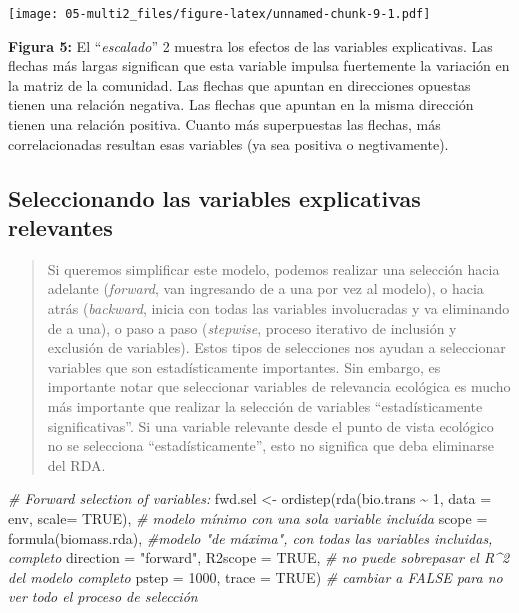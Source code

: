 \documentclass[
]{book}
\newenvironment{Shaded}{\begin{snugshade}}{\end{snugshade}}
\newcommand{\AttributeTok}[1]{\textcolor[rgb]{0.77,0.63,0.00}{#1}}
\newcommand{\CommentTok}[1]{\textcolor[rgb]{0.56,0.35,0.01}{\textit{#1}}}
\newcommand{\ConstantTok}[1]{\textcolor[rgb]{0.00,0.00,0.00}{#1}}
\newcommand{\DecValTok}[1]{\textcolor[rgb]{0.00,0.00,0.81}{#1}}
\newcommand{\FunctionTok}[1]{\textcolor[rgb]{0.00,0.00,0.00}{#1}}
\newcommand{\NormalTok}[1]{#1}
\newcommand{\OtherTok}[1]{\textcolor[rgb]{0.56,0.35,0.01}{#1}}
\newcommand{\SpecialCharTok}[1]{\textcolor[rgb]{0.00,0.00,0.00}{#1}}
\newcommand{\StringTok}[1]{\textcolor[rgb]{0.31,0.60,0.02}{#1}}
\begin{document}
\texttt{[image: 05-multi2\_files/figure-latex/unnamed-chunk-9-1.pdf]}

\textbf{Figura 5:} El ``\emph{escalado}'' 2 muestra los efectos de las variables explicativas. Las flechas más largas significan que esta variable impulsa fuertemente la variación en la matriz de la comunidad. Las flechas que apuntan en direcciones opuestas tienen una relación negativa. Las flechas que apuntan en la misma dirección tienen una relación positiva. Cuanto más superpuestas las flechas, más correlacionadas resultan esas variables (ya sea positiva o negtivamente).

\hypertarget{seleccionando-las-variables-explicativas-relevantes}{%
\subsection{Seleccionando las variables explicativas relevantes}\label{seleccionando-las-variables-explicativas-relevantes}}

\begin{quote}
Si queremos simplificar este modelo, podemos realizar una selección hacia adelante (\emph{forward}, van ingresando de a una por vez al modelo), o hacia atrás (\emph{backward}, inicia con todas las variables involucradas y va eliminando de a una), o paso a paso (\emph{stepwise}, proceso iterativo de inclusión y exclusión de variables). Estos tipos de selecciones nos ayudan a seleccionar variables que son estadísticamente importantes. Sin embargo, es importante notar que seleccionar variables de relevancia ecológica es mucho más importante que realizar la selección de variables ``estadísticamente significativas''. Si una variable relevante desde el punto de vista ecológico no se selecciona ``estadísticamente'', esto no significa que deba eliminarse del RDA.
\end{quote}

\begin{Shaded}
\begin{Highlighting}[]
\CommentTok{\# Forward selection of variables:}
\NormalTok{fwd.sel }\OtherTok{\textless{}{-}} \FunctionTok{ordistep}\NormalTok{(}\FunctionTok{rda}\NormalTok{(bio.trans }\SpecialCharTok{\textasciitilde{}} \DecValTok{1}\NormalTok{, }\AttributeTok{data =}\NormalTok{ env, }\AttributeTok{scale=} \ConstantTok{TRUE}\NormalTok{), }\CommentTok{\# modelo mínimo con una sola variable incluída}
               \AttributeTok{scope =} \FunctionTok{formula}\NormalTok{(biomass.rda), }\CommentTok{\#modelo "de máxima", con todas las variables incluidas, completo}
               \AttributeTok{direction =} \StringTok{"forward"}\NormalTok{,}
               \AttributeTok{R2scope =} \ConstantTok{TRUE}\NormalTok{, }\CommentTok{\# no puede sobrepasar el R\^{}2 del modelo completo}
               \AttributeTok{pstep =} \DecValTok{1000}\NormalTok{,}
               \AttributeTok{trace =} \ConstantTok{TRUE}\NormalTok{) }\CommentTok{\# cambiar a FALSE para no ver todo el proceso de selección}
\end{Highlighting}
\end{Shaded}
\end{document}
